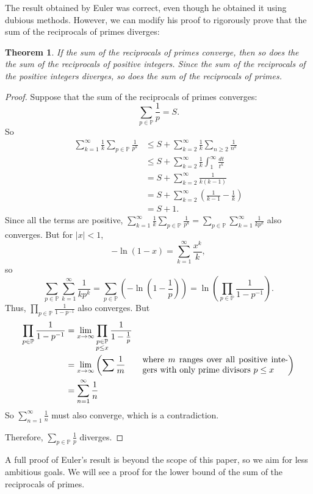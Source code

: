 \documentclass[a4paper]{article}
\newtheorem{theorem}{Theorem}[section]
\theoremstyle{definition}
\theoremstyle{remark}
\begin{document}
The result obtained by Euler was correct, even though he obtained it using dubious methods. However, we can modify his proof to rigorously prove that the sum of the reciprocals of primes diverges:
\begin{theorem}
  If the sum of the reciprocals of primes converge, then so does the the sum of the reciprocals of positive integers. Since the sum of the reciprocals of the positive integers diverges, so does the sum of the reciprocals of primes.
  \label{thm:reciprocalPrimeDiverge}
\end{theorem}
\begin{proof}
  Suppose that the sum of the reciprocals of primes converges:
  \[
  \sum_{p\in\mathbb{P}}\frac{1}{p}=S
  .
  \]
  So
  \begin{align*}
    \sum_{k=1}^\infty\frac{1}{k}\sum_{p\in\mathbb{P}}\frac{1}{p^k}&\le S + \sum_{k=2}^\infty\frac{1}{k}\sum_{n\ge2}\frac{1}{n^k}\\
    &\le S+\sum_{k=2}^\infty\frac{1}{k}\int_1^\infty\frac{dt}{t^k}\\
    &=S+\sum_{k=2}^\infty\frac{1}{k(k-1)}\\
    &=S+\sum_{k=2}^\infty\left( \frac{1}{k-1}-\frac{1}{k} \right)\\
    &=S+1
    .
  \end{align*}
  Since all the terms are positive, $\displaystyle\sum_{k=1}^\infty\frac{1}{k}\sum_{p\in\mathbb{P}}\frac{1}{p^k}=\sum_{p\in\mathbb{P}}\sum_{k=1}^\infty\frac{1}{kp^k}$ also converges. But for $|x|<1$, 
  \[
  -\ln(1-x)=\sum_{k=1}^\infty\frac{x^k}{k}
  ,
  \]
  so
  \[
  \sum_{p\in\mathbb{P}}\sum_{k=1}^\infty\frac{1}{kp^k}=\sum_{p\in\mathbb{P}}\left( -\ln\left( 1-\frac{1}{p} \right) \right)=\ln\left( \prod_{p\in\mathbb{P}}\frac{1}{1-p^{-1}} \right)
  .
  \]
  Thus, $\displaystyle\prod_{p\in\mathbb{P}}\frac{1}{1-p^{-1}}$ also converges. But
  \begin{align*}
    \prod_{p\in\mathbb{P}}\frac{1}{1-p^{-1}}&=\lim_{x\to\infty}\prod\limits_{\substack{p\in\mathbb{P}\\p\le x}}\frac{1}{1-\frac{1}{p}}\\
    &=\lim_{x\to\infty}\left( \sum\frac{1}{m}\qquad\parbox{6cm}{where $m$ ranges over all positive integers with only prime divisors $p\le x$} \right)\\
    &=\sum_{n=1}^\infty\frac{1}{n}
  \end{align*}
  So $\displaystyle\sum_{n=1}^\infty\frac{1}{n}$ must also converge, which is a contradiction.

  Therefore, $\displaystyle\sum_{p\in\mathbb{P}}\frac{1}{p}$ diverges.
\end{proof}
A full proof of Euler's result is beyond the scope of this paper, so we aim for less ambitious goals. We will see a proof for the lower bound of the sum of the reciprocals of primes.
\end{document}
